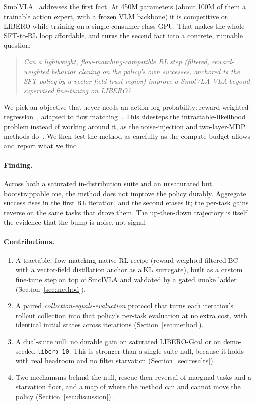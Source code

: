 \documentclass[11pt]{article}
\newcommand{\libgoal}{LIBERO-Goal}
\newcommand{\libten}{\texttt{libero\_10}}
\begin{document}
SmolVLA~\citep{shukor2025smolvla} addresses the first fact. At 450M parameters (about 100M of them
a trainable action expert, with a frozen VLM backbone) it is competitive on LIBERO while training
on a single consumer-class GPU. That makes the whole SFT-to-RL loop affordable, and turns the
second fact into a concrete, runnable question:

\begin{quote}
\emph{Can a lightweight, flow-matching-compatible RL step (filtered, reward-weighted behavior
cloning on the policy's own successes, anchored to the SFT policy by a vector-field trust-region)
improve a SmolVLA VLA beyond supervised fine-tuning on LIBERO?}
\end{quote}

We pick an objective that never needs an action log-probability: reward-weighted
regression~\citep{peters2007rwr,peng2019awr}, adapted to flow matching~\citep{orwcfm2025}. This
sidesteps the intractable-likelihood problem instead of working around it, as the noise-injection
and two-layer-MDP methods do~\citep{ren2024dppo,chen2025pirl,reinflow2025,flowgrpo2025}. We then
test the method as carefully as the compute budget allows and report what we find.

\paragraph{Finding.} Across both a saturated in-distribution suite and an unsaturated but
bootstrappable one, the method does not improve the policy durably. Aggregate success rises in the
first RL iteration, and the second erases it; the per-task gains reverse on the same tasks that
drove them. The up-then-down trajectory is itself the evidence that the bump is noise, not signal.

\paragraph{Contributions.}
\begin{enumerate}\itemsep2pt
  \item A tractable, flow-matching-native RL recipe (reward-weighted filtered BC with a
  vector-field distillation anchor as a KL surrogate), built as a custom fine-tune step on top of
  SmolVLA and validated by a gated smoke ladder (Section~\ref{sec:method}).
  \item A paired \emph{collection-equals-evaluation} protocol that turns each iteration's rollout
  collection into that policy's per-task evaluation at no extra cost, with identical initial states
  across iterations (Section~\ref{sec:method}).
  \item A dual-suite null: no durable gain on saturated \libgoal{} or on demo-seeded \libten{}.
  This is stronger than a single-suite null, because it holds with real headroom and no filter
  starvation (Section~\ref{sec:results}).
  \item Two mechanisms behind the null, rescue-then-reversal of marginal tasks and a starvation
  floor, and a map of where the method can and cannot move the policy (Section~\ref{sec:discussion}).
\end{enumerate}
\end{document}
